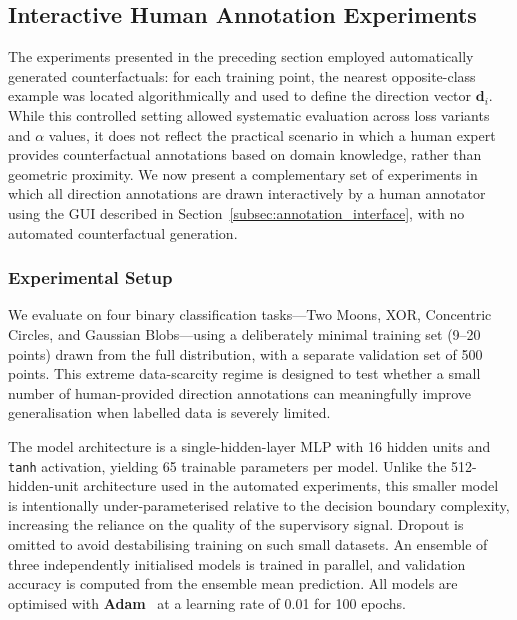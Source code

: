 %
%

\subsection{Interactive Human Annotation Experiments}
\label{subsec:interactive_results}

The experiments presented in the preceding section employed automatically generated counterfactuals: for each training point, the nearest opposite-class example was located algorithmically and used to define the direction vector $\mathbf{d}_i$. While this controlled setting allowed systematic evaluation across loss variants and $\alpha$ values, it does not reflect the practical scenario in which a human expert provides counterfactual annotations based on domain knowledge, rather than geometric proximity. We now present a complementary set of experiments in which all direction annotations are drawn interactively by a human annotator using the GUI described in Section~\ref{subsec:annotation_interface}, with no automated counterfactual generation.

\subsubsection{Experimental Setup}

We evaluate on four binary classification tasks---Two Moons, XOR, Concentric Circles, and Gaussian Blobs---using a deliberately minimal training set (9--20 points) drawn from the full distribution, with a separate validation set of 500 points. This extreme data-scarcity regime is designed to test whether a small number of human-provided direction annotations can meaningfully improve generalisation when labelled data is severely limited.

The model architecture is a single-hidden-layer MLP with 16 hidden units and \texttt{tanh} activation, yielding 65 trainable parameters per model. Unlike the 512-hidden-unit architecture used in the automated experiments, this smaller model is intentionally under-parameterised relative to the decision boundary complexity, increasing the reliance on the quality of the supervisory signal. Dropout is omitted to avoid destabilising training on such small datasets. An ensemble of three independently initialised models is trained in parallel, and validation accuracy is computed from the ensemble mean prediction. All models are optimised with \textbf{Adam}~\citep{kingma2014adam} at a learning rate of 0.01 for 100 epochs.

